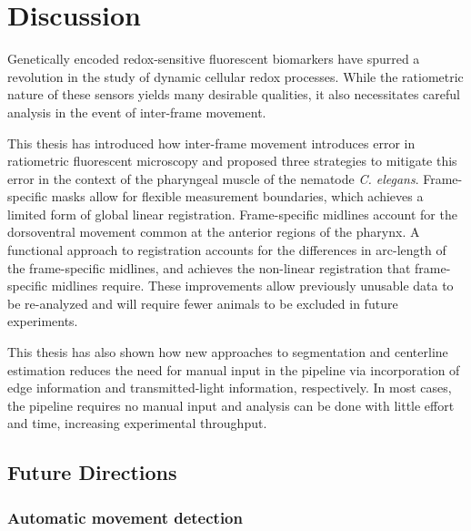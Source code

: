 \chapter{Discussion}

\label{Chapter4}

Genetically encoded redox-sensitive fluorescent biomarkers have spurred a revolution in the study of dynamic cellular redox processes. While the ratiometric nature of these sensors yields many desirable qualities, it also necessitates careful analysis in the event of inter-frame movement. 

This thesis has introduced how inter-frame movement introduces error in ratiometric fluorescent microscopy and proposed three strategies to mitigate this error in the context of the pharyngeal muscle of the nematode \textit{C. elegans}. Frame-specific masks allow for flexible measurement boundaries, which achieves a limited form of global linear registration. Frame-specific midlines account for the dorsoventral movement common at the anterior regions of the pharynx. A functional approach to registration accounts for the differences in arc-length of the frame-specific midlines, and achieves the non-linear registration that frame-specific midlines require. These improvements allow previously unusable data to be re-analyzed and will require fewer animals to be excluded in future experiments.

This thesis has also shown how new approaches to segmentation and centerline estimation reduces the need for manual input in the pipeline via incorporation of edge information and transmitted-light information, respectively. In most cases, the pipeline requires no manual input and analysis can be done with little effort and time, increasing experimental throughput.

\section{Future Directions}

\subsection{Automatic movement detection}


